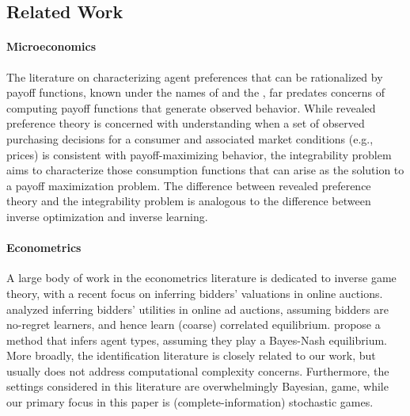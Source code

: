 \subsection{Related Work}

\paragraph{Microeconomics}

The literature on characterizing agent preferences that can be rationalized by payoff functions, known under the names of  \cite{samuelson1948consumption, afriat1967construction, varian1982nonparametric, varian2006revealed} and the  \cite{mas-colell}, far predates concerns of computing payoff functions that generate observed behavior.
While revealed preference theory is concerned with understanding when a set of observed purchasing decisions for a consumer and associated market conditions (e.g., prices) is consistent with payoff-maximizing behavior, the integrability problem aims to characterize those consumption functions that can arise as the solution to a payoff maximization problem.
The difference between revealed preference theory and the integrability problem is analogous to the difference between inverse optimization and inverse learning.


\paragraph{Econometrics}

A large body of work in the econometrics literature is dedicated to inverse game theory, with a recent focus on inferring bidders' valuations in online auctions. \citeauthor{nekipelov2015econometrics} \citeyear{nekipelov2015econometrics} analyzed inferring bidders' utilities in online ad auctions, assuming bidders are no-regret learners, and hence learn (coarse) correlated equilibrium.
\citeauthor{syrgkanis2017inference} \citeyear{syrgkanis2017inference} propose a method that infers agent types, assuming they play a Bayes-Nash equilibrium.
More broadly, the identification literature \cite{bresnahan1991empirical, lise2001estimating, bajari2010identification} is closely related to our work, but usually does not address computational complexity concerns.
Furthermore, the settings considered in this literature are overwhelmingly  Bayesian, game, while our primary focus in this paper is (complete-information) stochastic games.


